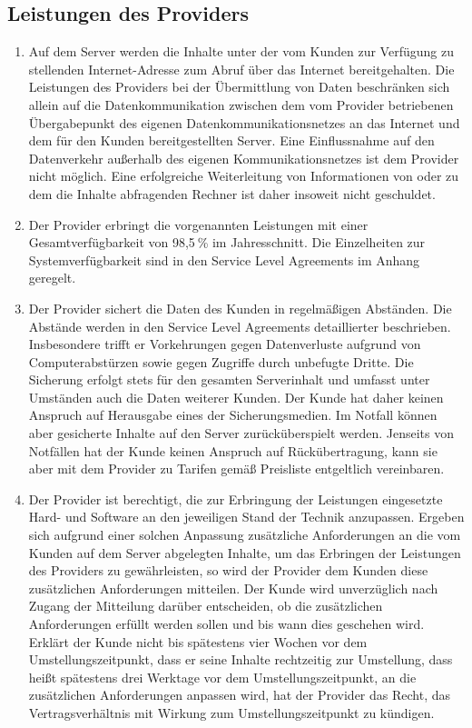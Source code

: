 \documentclass{terms}
\begin{document}
\subsection{Leistungen des Providers}
\begin{enumerate}
\item Auf dem Server werden die Inhalte unter der vom Kunden zur Verfügung zu stellenden Internet-Adresse zum Abruf über das Internet bereitgehalten. Die Leistungen des Providers bei der Übermittlung von Daten beschränken sich allein auf die Datenkommunikation zwischen dem vom Provider betriebenen Übergabepunkt des eigenen Datenkommunikationsnetzes an das Internet und dem für den Kunden bereitgestellten Server. Eine Einflussnahme auf den Datenverkehr außerhalb des eigenen Kommunikationsnetzes ist dem Provider nicht möglich. Eine erfolgreiche Weiterleitung von Informationen von oder zu dem die Inhalte abfragenden Rechner ist daher insoweit nicht geschuldet.
\item Der Provider erbringt die vorgenannten Leistungen mit einer Gesamtverfügbarkeit von 98,5 \% im Jahresschnitt. Die Einzelheiten zur Systemverfügbarkeit sind in den Service Level Agreements im Anhang geregelt. 
\item Der Provider sichert die Daten des Kunden in regelmäßigen Abständen. Die Abstände werden in den Service Level Agreements detaillierter beschrieben. Insbesondere trifft er Vorkehrungen gegen Datenverluste aufgrund von Computerabstürzen sowie gegen Zugriffe durch unbefugte Dritte. Die Sicherung erfolgt stets für den gesamten Serverinhalt und umfasst unter Umständen auch die Daten weiterer Kunden. Der Kunde hat daher keinen Anspruch auf Herausgabe eines der Sicherungsmedien. Im Notfall können aber gesicherte Inhalte auf den Server zurücküberspielt werden. Jenseits von Notfällen hat der Kunde keinen Anspruch auf Rückübertragung, kann sie aber mit dem Provider zu Tarifen gemäß Preisliste entgeltlich vereinbaren.
\item Der Provider ist berechtigt, die zur Erbringung der Leistungen eingesetzte Hard- und Software an den jeweiligen Stand der Technik anzupassen. Ergeben sich aufgrund einer solchen Anpassung zusätzliche Anforderungen an die vom Kunden auf dem Server abgelegten Inhalte, um das Erbringen der Leistungen des Providers zu gewährleisten, so wird der Provider dem Kunden diese zusätzlichen Anforderungen mitteilen. Der Kunde wird unverzüglich nach Zugang der Mitteilung darüber entscheiden, ob die zusätzlichen Anforderungen erfüllt werden sollen und bis wann dies geschehen wird. Erklärt der Kunde nicht bis spätestens vier Wochen vor dem Umstellungszeitpunkt, dass er seine Inhalte rechtzeitig zur Umstellung, dass heißt spätestens drei Werktage vor dem Umstellungszeitpunkt, an die zusätzlichen Anforderungen anpassen wird, hat der Provider das Recht, das Vertragsverhältnis mit Wirkung zum Umstellungszeitpunkt zu kündigen.
\end{enumerate}
\end{document}
